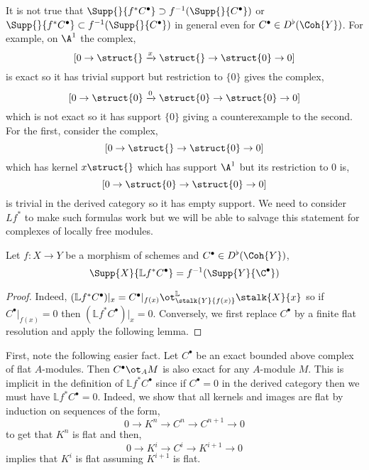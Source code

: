 \documentclass[12pt]{article}
\begin{document}
\begin{rmk}
It is not true that $\Supp{}{f^* C^\bullet} \supset f^{-1}(\Supp{}{C^\bullet})$ or $\Supp{}{f^* C^\bullet} \subset f^{-1}(\Supp{}{C^\bullet})$ in general even for $C^\bullet \in D^\flat(\Coh{Y})$. For example, on $\A^1$ the complex,
\[ [0 \to \struct{} \xrightarrow{x} \struct{} \to \struct{0} \to 0] \]
is exact so it has trivial support but restriction to $\{ 0 \}$ gives the complex,
\[ [0 \to \struct{0} \xrightarrow{0} \struct{0} \to \struct{0} \to 0] \]
which is not exact so it has support $\{ 0 \}$ giving a counterexample to the second. For the first, consider the complex,
\[ [ 0 \to \struct{} \to \struct{0} \to 0] \]
which has kernel $x \struct{}$ which has support $\A^1$ but its restriction to $0$ is,
\[ [0 \to \struct{0} \to \struct{0} \to 0] \]
is trivial in the derived category so it has empty support. We need to consider $L f^*$ to make such formulas work but we will be able to salvage this statement for complexes of locally free modules.
\end{rmk}

\newcommand{\LL}{\mathbb{L}}

\begin{lemma}
Let $f : X \to Y$ be a morphism of schemes and $C^\bullet \in D^\flat(\Coh{Y})$,
\[ \Supp{X}{\LL f^* C^\bullet} = f^{-1}(\Supp{Y}{\C^\bullet}) \]
\end{lemma}

\begin{proof}
Indeed, $(\LL f^* C^\bullet)|_{x} = C^\bullet|_{f(x)} \ot^{\LL}_{\stalk{Y}{f(x)}} \stalk{X}{x}$ so if $C^\bullet|_{f(x)} = 0$ then $(\LL f^* C^\bullet)|_x = 0$. Conversely, we first replace $C^\bullet$ by a finite flat resolution and apply the following lemma.
\end{proof}

\begin{rmk}
First, note the following easier fact. Let $C^\bullet$ be an exact bounded above complex of flat $A$-modules. Then $C^\bullet \ot_A M$ is also exact for any $A$-module $M$. This is implicit in the definition of $\LL f^* C^\bullet$ since if $C^\bullet = 0$ in the derived category then we must have $\LL f^* C^\bullet = 0$. Indeed, we show that all kernels and images are flat by induction on sequences of the form,
\[ 0 \to K^n \to C^n \to C^{n+1} \to 0 \]
to get that $K^n$ is flat and then,
\[ 0 \to K^i \to C^i \to K^{i+1} \to 0 \]
implies that $K^i$ is flat assuming $K^{i+1}$ is flat. 
\end{rmk}
\end{document}
